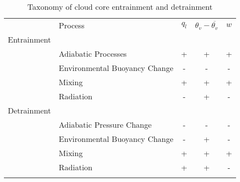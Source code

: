 \documentclass[acp]{copernicus}
\begin{document}






\begin{table*}[t]
\caption{Taxonomy of cloud core entrainment and detrainment}
\vskip4mm
\centering
\begin{tabular}{llccc}
\tophline
& Process & $q_l$ & $\theta_v - \overline{\theta_v}$ & $w$\\

\middlehline
Entrainment & & & & \\
& Adiabatic Processes & + & + & + \\
& Environmental Buoyancy Change & - & - & - \\
& Mixing & + & + & + \\
& Radiation & - & + & - \\

\middlehline
Detrainment & & & & \\
& Adiabatic Pressure Change & - & - & - \\
& Environmental Buoyancy Change & - & + & - \\
& Mixing & + & + & + \\
& Radiation & + & + & - \\


\bottomhline
\end{tabular}
\end{table*}





\end{document}
